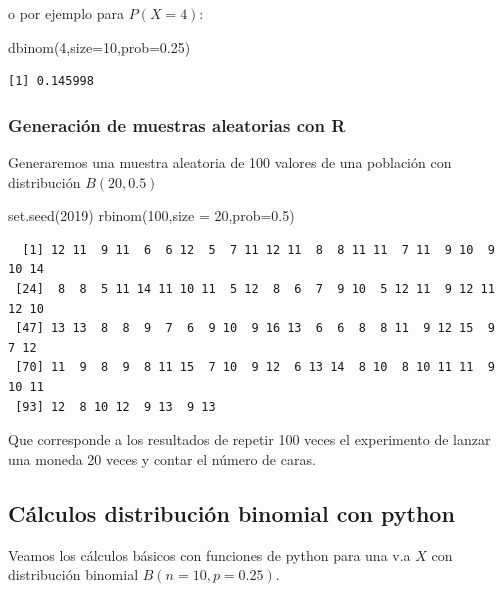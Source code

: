 \documentclass[
  letterpaper,
  DIV=11,
  numbers=noendperiod]{scrreprt}
\newenvironment{Shaded}{\begin{snugshade}}{\end{snugshade}}
\newcommand{\AttributeTok}[1]{\textcolor[rgb]{0.40,0.45,0.13}{#1}}
\newcommand{\DecValTok}[1]{\textcolor[rgb]{0.68,0.00,0.00}{#1}}
\newcommand{\FloatTok}[1]{\textcolor[rgb]{0.68,0.00,0.00}{#1}}
\newcommand{\FunctionTok}[1]{\textcolor[rgb]{0.28,0.35,0.67}{#1}}
\newcommand{\NormalTok}[1]{\textcolor[rgb]{0.00,0.23,0.31}{#1}}
\begin{document}
o por ejemplo para \(P(X=4)\):

\begin{Shaded}
\begin{Highlighting}[]
\FunctionTok{dbinom}\NormalTok{(}\DecValTok{4}\NormalTok{,}\AttributeTok{size=}\DecValTok{10}\NormalTok{,}\AttributeTok{prob=}\FloatTok{0.25}\NormalTok{)}
\end{Highlighting}
\end{Shaded}

\begin{verbatim}
[1] 0.145998
\end{verbatim}

\subsubsection{Generación de muestras aleatorias con
R}\label{generaciuxf3n-de-muestras-aleatorias-con-r}

Generaremos una muestra aleatoria de 100 valores de una población con
distribución \(B(20,0.5)\)

\begin{Shaded}
\begin{Highlighting}[]
\FunctionTok{set.seed}\NormalTok{(}\DecValTok{2019}\NormalTok{)}
\FunctionTok{rbinom}\NormalTok{(}\DecValTok{100}\NormalTok{,}\AttributeTok{size =} \DecValTok{20}\NormalTok{,}\AttributeTok{prob=}\FloatTok{0.5}\NormalTok{)}
\end{Highlighting}
\end{Shaded}

\begin{verbatim}
  [1] 12 11  9 11  6  6 12  5  7 11 12 11  8  8 11 11  7 11  9 10  9 10 14
 [24]  8  8  5 11 14 11 10 11  5 12  8  6  7  9 10  5 12 11  9 12 11 12 10
 [47] 13 13  8  8  9  7  6  9 10  9 16 13  6  6  8  8 11  9 12 15  9  7 12
 [70] 11  9  8  9  8 11 15  7 10  9 12  6 13 14  8 10  8 10 11 11  9 10 11
 [93] 12  8 10 12  9 13  9 13
\end{verbatim}

Que corresponde a los resultados de repetir 100 veces el experimento de
lanzar una moneda 20 veces y contar el número de caras.

\subsection{Cálculos distribución binomial con
python}\label{cuxe1lculos-distribuciuxf3n-binomial-con-python}

Veamos los cálculos básicos con funciones de python para una v.a \(X\)
con distribución binomial \(B(n=10,p=0.25)\).
\end{document}
